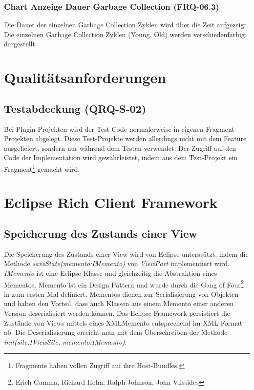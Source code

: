 \subsubsection{Chart Anzeige Dauer Garbage Collection (FRQ-06.3)}
Die Dauer der einzelnen Garbage Collection Zyklen wird über die Zeit aufgezeigt. Die einzelnen Garbage Collection Zyklen (Young, Old) werden verschiedenfarbig dargestellt.


\section{Qualitätsanforderungen}
\subsection{Testabdeckung (QRQ-S-02)}\label{testing}
Bei Plugin-Projekten wird der Test-Code normalerweise in eigenen Fragment-Projekten abgelegt. Diese Test-Projekte werden allerdings nicht mit dem Feature ausgeliefert, sondern nur während dem Testen verwendet. Der Zugriff auf den Code der Implementation wird gewährleistet, indem aus dem Test-Projekt ein Fragment\footnote{Fragmente haben vollen Zugriff auf ihre Host-Bundles.} gemacht wird.

\section{Eclipse Rich Client Framework}
\subsection{Speicherung des Zustands einer View}\label{memento}
Die Speicherung des Zustands einer View wird von Eclipse unterstützt, indem die Methode \textit{saveState(memento:IMemento)} von \textit{ViewPart} implementiert wird. \textit{IMemento} ist eine Eclipse-Klasse und gleichzeitig die Abstraktion eines Mementos. Memento ist ein Design Pattern und wurde durch die Gang of Four\footnote{Erich Gamma, Richard Helm, Ralph Johnson, John Vlissides} in \cite[S. 283]{gamma1995design} zum ersten Mal definiert. Mementos dienen zur Serialisierung von Objekten und haben den Vorteil, dass auch Klassen aus einem Memento einer anderen Version deserialisiert werden können. Das Eclipse-Framework persistiert die Zustände von Views mittels eines XMLMemento entsprechend im XML-Format ab. Die Deserialisierung erreicht man mit dem Überschreiben der Methode \textit{init(site:IViewSite, memento:IMemento)}.

